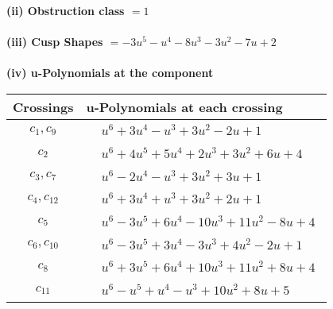 \documentclass[1p]{elsarticle_modified}
\theoremstyle{definition}
\begin{document}
\flushleft \textbf{(ii) Obstruction class $= 1$}\\~\\
\flushleft \textbf{(iii) Cusp Shapes $= -3 u^5- u^4-8 u^3-3 u^2-7 u+2$}\\~\\
\newpage\renewcommand{\arraystretch}{1}
\flushleft \textbf{(iv) u-Polynomials at the component}\newline \\
\begin{tabular}{m{50pt}|m{274pt}}
Crossings & \hspace{64pt}u-Polynomials at each crossing \\
\hline $$\begin{aligned}c_{1},c_{9}\end{aligned}$$&$\begin{aligned}
&u^6+3 u^4- u^3+3 u^2-2 u+1
\end{aligned}$\\
\hline $$\begin{aligned}c_{2}\end{aligned}$$&$\begin{aligned}
&u^6+4 u^5+5 u^4+2 u^3+3 u^2+6 u+4
\end{aligned}$\\
\hline $$\begin{aligned}c_{3},c_{7}\end{aligned}$$&$\begin{aligned}
&u^6-2 u^4- u^3+3 u^2+3 u+1
\end{aligned}$\\
\hline $$\begin{aligned}c_{4},c_{12}\end{aligned}$$&$\begin{aligned}
&u^6+3 u^4+u^3+3 u^2+2 u+1
\end{aligned}$\\
\hline $$\begin{aligned}c_{5}\end{aligned}$$&$\begin{aligned}
&u^6-3 u^5+6 u^4-10 u^3+11 u^2-8 u+4
\end{aligned}$\\
\hline $$\begin{aligned}c_{6},c_{10}\end{aligned}$$&$\begin{aligned}
&u^6-3 u^5+3 u^4-3 u^3+4 u^2-2 u+1
\end{aligned}$\\
\hline $$\begin{aligned}c_{8}\end{aligned}$$&$\begin{aligned}
&u^6+3 u^5+6 u^4+10 u^3+11 u^2+8 u+4
\end{aligned}$\\
\hline $$\begin{aligned}c_{11}\end{aligned}$$&$\begin{aligned}
&u^6- u^5+u^4- u^3+10 u^2+8 u+5
\end{aligned}$\\
\hline
\end{tabular}\\~\\
\end{document}
